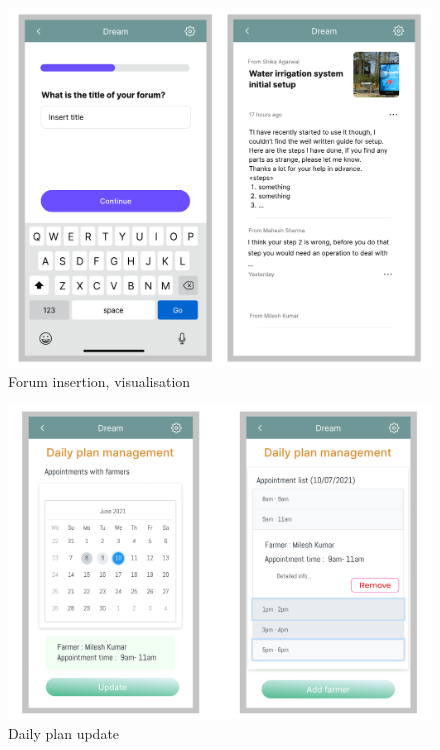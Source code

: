 \begin{figure}[H]
	\centering
    \includegraphics[page=1, width=\textwidth]{Images/UI/forum.pdf}
	\caption{\label{fig:FE_image3}Forum insertion, visualisation}

\end{figure}

\begin{figure}[H]
	\centering
    \includegraphics[page=1, width=\textwidth]{Images/UI/daily-plan.pdf}

	\caption{\label{fig:FE_image4}Daily plan update}

\end{figure}

